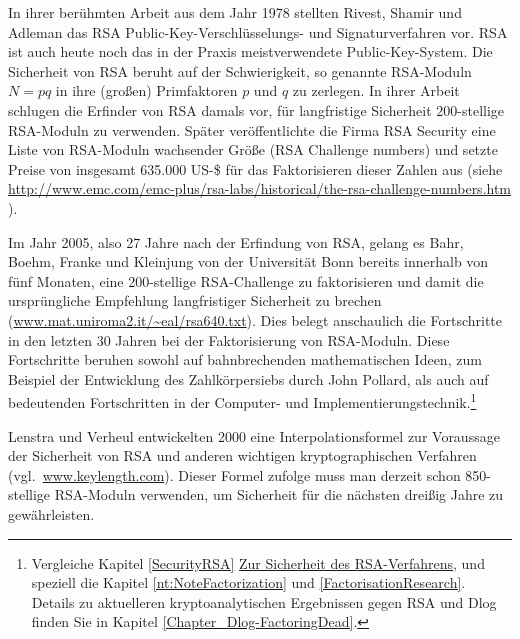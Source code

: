 \begin{refsegment}
In ihrer berühmten Arbeit aus dem Jahr 1978 stellten Rivest, Shamir und
Adleman \cite{rivest/shamir/adleman:1978} das RSA
Public-Key-Verschlüsselungs- und Signaturverfahren vor. RSA ist auch
heute noch das in der Praxis meistverwendete Public-Key-System. Die
Sicherheit von RSA beruht auf der Schwierigkeit, so genannte RSA-Moduln
$N=pq$ in ihre (großen) Primfaktoren $p$ und $q$ zu zerlegen. In ihrer
Arbeit schlugen die Erfinder von RSA damals vor, für langfristige
Sicherheit $200$-stellige RSA-Moduln zu verwenden. Später
veröffentlichte die Firma RSA Security eine Liste von RSA-Moduln
wachsender Größe (RSA Challenge numbers) und setzte Preise von insgesamt
635.000 US-\$ für das Faktorisieren dieser Zahlen aus (siehe
\url{http://www.emc.com/emc-plus/rsa-labs/historical/the-rsa-challenge-numbers.htm}
).

Im Jahr 2005, also 27 Jahre nach der Erfindung von RSA, gelang es Bahr,
Boehm, Franke und Kleinjung von der Universität Bonn bereits innerhalb
von fünf Monaten, eine 200-stellige RSA-Challenge zu faktorisieren und
damit die ursprüngliche Empfehlung langfristiger Sicherheit zu brechen
(\url{www.mat.uniroma2.it/~eal/rsa640.txt}).  Dies belegt anschaulich
die Fortschritte in den letzten 30 Jahren bei der Faktorisierung von
RSA-Moduln. Diese Fortschritte beruhen sowohl auf bahnbrechenden mathematischen
Ideen, zum Beispiel der Entwicklung des Zahlkörpersiebs durch John Pollard,
als auch auf bedeutenden Fortschritten in der Computer- und
Implementierungstechnik.\footnote{%
Vergleiche Kapitel \ref{SecurityRSA}
\hyperlink{SecurityRSA}{Zur Sicherheit des RSA-Verfahrens}, und
speziell die Kapitel \ref{nt:NoteFactorization} und \ref{FactorisationResearch}.
Details zu aktuelleren kryptoanalytischen Ergebnissen gegen
RSA und Dlog finden Sie in Kapitel \ref{Chapter_Dlog-FactoringDead}.
}

Lenstra und Verheul entwickelten 2000 eine
Interpolationsformel zur Voraussage der Sicherheit
von RSA und anderen wichtigen kryptographischen Verfahren
(vgl.\ \url{www.keylength.com}). Dieser Formel zufolge muss man
derzeit schon 850-stellige RSA-Moduln verwenden,
um Sicherheit für die nächsten dreißig Jahre zu gewährleisten.


\end{refsegment}
